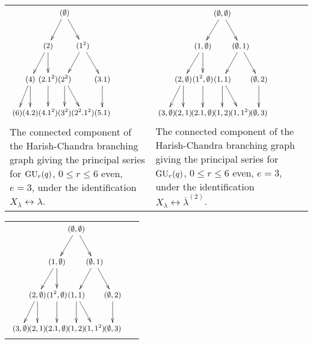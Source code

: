 \documentclass[twoside,12pt]{amsart}
\theoremstyle{plain}
\begin{document}
\begin{center}
 
\begin{tabular}{M{5.5cm}|M{5.5cm}}
${\small
\begin{xy}
\xymatrix@C-30pt{
& & & (\emptyset) \ar[dl] \ar[dr] & & \\ 
& & (2) \ar[dl] \ar[d] & &  (1^2) \ar[dl] \ar[dr]  & \\
& (4) \ar[dl] \ar[d] & (2.1^2)  \ar[d] & (2^2) \ar[d] \ar[dr] & & (3.1) \ar[d] \\
(6) & (4.2) & (4.1^2) & (3^2) & (2^2.1^2) & (5.1)
}
\end{xy}
}$

&

$
{\small
\begin{xy}
\xymatrix@C-31pt{
& & & (\emptyset,\emptyset) \ar[dl] \ar[dr] & & \\ 
& & (1,\emptyset) \ar[dl] \ar[d] & &  (\emptyset,1) \ar[dl] \ar[dr]  & \\
& (2,\emptyset) \ar[dl] \ar[d] & (1^2,\emptyset)  \ar[d] & (1,1) \ar[d] \ar[dr] & & (\emptyset,2) \ar[d] \\
(3,\emptyset) & (2,1) & (2.1,\emptyset) & (1,2) & (1,1^2) & (\emptyset,3)
}
\end{xy}
}
$

\tabularnewline

The connected component of the Harish-Chandra branching graph giving the 
principal series for ${\mbox{\rm GU}}_r(q)$, $0 \leq r \leq 6$ even, $e=3$, 
under the identification $X_{\lambda}\leftrightarrow {\lambda}$.

&

The connected component of the Harish-Chandra branching graph giving the 
principal series for ${\mbox{\rm GU}}_r(q)$, $0 \leq r \leq 6$ even, $e=3$,
under the identification $X_{\lambda}\leftrightarrow \overline{\lambda}^{(2)}$.

\end{tabular}

\begin{tabular}{M{5.5cm}|M{5.5cm}}
$
{\small
\begin{xy}
\xymatrix@C-31pt{
& & & (\emptyset,\emptyset) \ar[dl] \ar[dr] & & \\ 
& & (1,\emptyset) \ar[dl] \ar[d] & &  (\emptyset,1) \ar[dl] \ar[dr]  & \\
& (2,\emptyset) \ar[dl] \ar[d] & (1^2,\emptyset)  \ar[d] & (1,1) \ar[d] \ar[dr] & & (\emptyset,2) \ar[d] \\
(3,\emptyset) & (2,1) & (2.1,\emptyset) & (1,2) & (1,1^2) & (\emptyset,3)
}
\end{xy}
}
$


\end{tabular}
\end{center}
\end{document}
